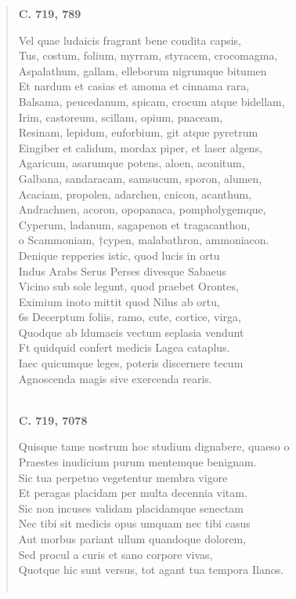 \documentclass[11pt, a4paper]{report}
\begin{document}
\begin{verse}
     \marginpar{[199]} \begin{center} \textbf{C. 719, 789} \end{center}Vel quae ludaicis fragrant bene condita capsis, \\ Tus, costum, folium, myrram, styracem, crocomagma, \\ Aspalathum, gallam, elleborum nigrumque bitumen \\ Et nardum et casias et amoma et cinnama rara, \\ Balsama, peucedanum, spicam, crocum atque bidellam, \\ Irim, castoreum, scillam, opium, pnaceam, \\ Resinam, lepidum, euforbium, git atque pyretrum \\ Eingiber et calidum, mordax piper, et laser algens, \\ Agaricum, asarumque potens, aloen, aconitum, \\ Galbana, sandaracam, samsucum, sporon, alumen, \\ Acaciam, propolen, adarchen, cnicon, acanthum, \\ Andrachnen, acoron, opopanaca, pompholygemque, \\ Cyperum, ladanum, sagapenon et tragacanthon, \\ o Scammoniam, †cypen, malabathron, ammoniacon. \\ Denique repperies istic, quod lucis in ortu \\ Indus Arabs Serus Perses divesque Sabaeus \\ Vicino sub sole legunt, quod praebet Orontes, \\ Eximium inoto mittit quod Nilus ab ortu, \\ 6s Decerptum foliis, ramo, cute, cortice, virga, \\ Quodque ab ldumaeis vectum seplasia vendunt \\ Ft quidquid confert medicis Lagea cataplus. \\ Iaec quicumque leges, poteris discernere tecum \\ Agnoscenda magis sive exercenda rearis. \\ 
        ﻿\pagebreak 
     \marginpar{[200]} \begin{center} \textbf{C. 719, 7078} \end{center}Quisque tame nostrum hoc studium dignabere, quaeso o \\ Praestes inudicium purum mentemque benignam. \\ Sic tua perpetuo vegetentur membra vigore \\ Et peragas placidam per multa decennia vitam. \\ Sic non incuses validam placidamque senectam \\ Nec tibi sit medicis opus umquam nec tibi casus \\ Aut morbus pariant ullum quandoque dolorem, \\ Sed procul a curis et sano corpore vivas, \\ Quotque hic sunt versus, tot agant tua tempora Ilanos. \\ 
        ﻿\pagebreak 
    
      \end{verse}
  
\end{document}

